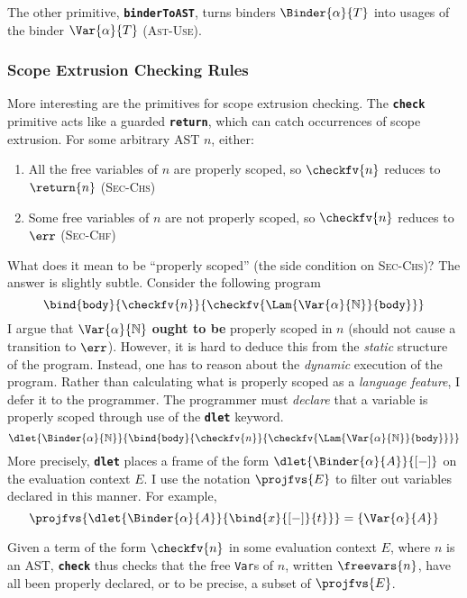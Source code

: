 The other primitive, \textbf{\texttt{binderToAST}}, turns binders $\Binder{\alpha}{T}$ into usages of the binder $\Var{\alpha}{T}$ (\textsc{Ast-Use}). 

\subsubsection{Scope Extrusion Checking Rules}
More interesting are the primitives for scope extrusion checking. The \textbf{\texttt{check}} primitive acts like a guarded \textbf{\texttt{return}}, which can catch occurrences of scope extrusion. For some arbitrary AST $n$, either:
\begin{enumerate}
  \item All the free variables of $n$ are properly scoped, so $\checkfv{n}$ reduces to $\return{n}$ (\textsc{Sec-Chs})
  \item Some free variables of $n$ are not properly scoped, so $\checkfv{n}$ reduces to $\err$ (\textsc{Sec-Chf})
\end{enumerate}
What does it mean to be ``properly scoped'' (the side condition on \textsc{Sec-Chs})? The answer is slightly subtle. Consider the following program 
\[\bind{\texttt{body}}{\checkfv{n}}{\checkfv{\Lam{\Var{\alpha}{\mathbb{N}}}{\texttt{body}}}}\]
I argue that $\Var{\alpha}{\mathbb{N}}$ \textbf{ought to be} properly scoped in $n$ (should not cause a transition to $\err$). However, it is hard to deduce this from the \textit{static} structure of the program. Instead, one has to reason about the \textit{dynamic} execution of the program. Rather than calculating what is properly scoped as a \textit{language feature}, I defer it to the programmer. The programmer must \textit{declare} that a variable is properly scoped through use of the \textbf{\texttt{dlet}} keyword. 
\[\dlet{\Binder{\alpha}{\mathbb{N}}}{\bind{\texttt{body}}{\checkfv{n}}{\checkfv{\Lam{\Var{\alpha}{\mathbb{N}}}{\texttt{body}}}}}\]
More precisely, \textbf{\texttt{dlet}} places a frame of the form $\dlet{\Binder{\alpha}{A}}{[-]}$ on the evaluation context $E$. I use the notation $\projfvs{E}$ to filter out variables declared in this manner. For example,
\[\projfvs{\dlet{\Binder{\alpha}{A}}{\bind{x}{[-]}{t}}} = \{ \Var{\alpha}{A} \}\]

Given a term of the form $\checkfv{n}$ in some evaluation context $E$, where $n$ is an AST, \textbf{\texttt{check}} thus checks that the free \texttt{Var}s of $n$, written $\freevars{n}$, have all been properly declared, or to be precise, a subset of $\projfvs{E}$. 

